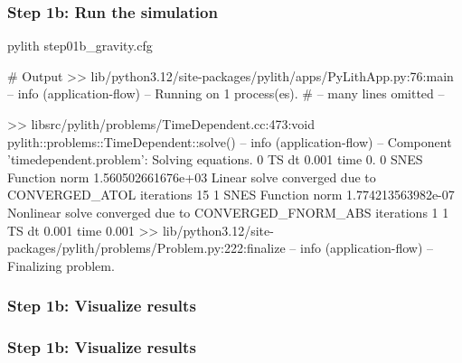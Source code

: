 \documentclass[aspectratio=169]{beamer}
\begin{document}
\begin{frame}[fragile]
  \frametitle{Step 1b: Run the simulation}
  \summary{}

\begin{pyrejournal}
pylith step01b_gravity.cfg

# Output
 >> lib/python3.12/site-packages/pylith/apps/PyLithApp.py:76:main
 -- info (application-flow)
 -- Running on 1 process(es).
# -- many lines omitted --

 >> libsrc/pylith/problems/TimeDependent.cc:473:void pylith::problems::TimeDependent::solve()
 -- info (application-flow)
 -- Component 'timedependent.problem': Solving equations.
0 TS dt 0.001 time 0.
    0 SNES Function norm 1.560502661676e+03
      Linear solve converged due to CONVERGED_ATOL iterations 15
    1 SNES Function norm 1.774213563982e-07
    Nonlinear solve converged due to CONVERGED_FNORM_ABS iterations 1
1 TS dt 0.001 time 0.001
 >> lib/python3.12/site-packages/pylith/problems/Problem.py:222:finalize
 -- info (application-flow)
 -- Finalizing problem.
\end{pyrejournal}
  
\end{frame}



\begin{frame}
  \frametitle{Step 1b: Visualize results}

    
\end{frame}


\begin{frame}
  \frametitle{Step 1b: Visualize results}

    
\end{frame}
\end{document}
